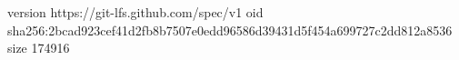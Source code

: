 version https://git-lfs.github.com/spec/v1
oid sha256:2bcad923cef41d2fb8b7507e0edd96586d39431d5f454a699727c2dd812a8536
size 174916
